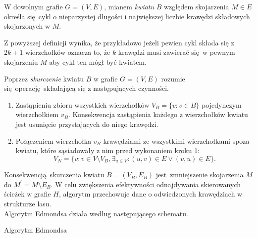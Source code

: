 \par{
  \begin{definition}
    W dowolnym grafie $G=(V, E)$, mianem \emph{kwiatu} $B$ względem skojarzenia $M \in E$ określa się cykl o nieparzystej długości i największej liczbie krawędzi składowych skojarzonych w $M$. 
  \end{definition}
  Z powyższej definicji wynika, że przykładowo jeżeli pewien cykl składa się z $2k + 1$ wierzchołków oznacza to, że $k$ krawędzi musi zawierać się w pewnym skojarzeniu $M$ aby cykl ten mógł być kwiatem.
  \begin{definition}
    Poprzez \emph{skurczenie} kwiatu $B$ w grafie $G=(V, E)$ rozumie się operację składającą się z następujących czynności.
    \begin{enumerate}
       \item Zastąpieniu zbioru wszystkich wierzchołków $V_B=\{v: v \in B\}$ pojedynczym wierzchołkiem $v_B$. Konsekwencja zastąpienia każdego z wierzchołków kwiatu jest usunięcie przystających do niego krawędzi.
       \item Połączeniem wierzchołka $v_B$ krawędziami ze wszystkimi wierzchołkami spoza kwiatu, które sąsiadowały z nim przed wykonaniem kroku 1: \[V_N=\{v: v \in V \setminus V_B, \exists_{u \in V}:(u,v)\in E \lor (v, u)\in E\}.\]
     \end{enumerate}
  \end{definition}
  Konsekwencją skurczenia kwiatu $B=(V_B, E_B)$ jest zmniejszenie skojarzenia $M$ do $M^\prime = M \setminus E_B$.
  W celu zwiększenia efektywności odnajdywania skierowanych ścieżek w grafie $H$, algorytm przechowuje dane o odwiedzonych krawędziach w strukturze lasu.\\
  Algorytm Edmondsa działa według następującego schematu.
  \begin{algorithm}
    \caption{Algorytm Edmondsa}\label{alg_Edmonds}
    \begin{algorithmic}[1]




\end{algorithmic}
\end{algorithm}}
